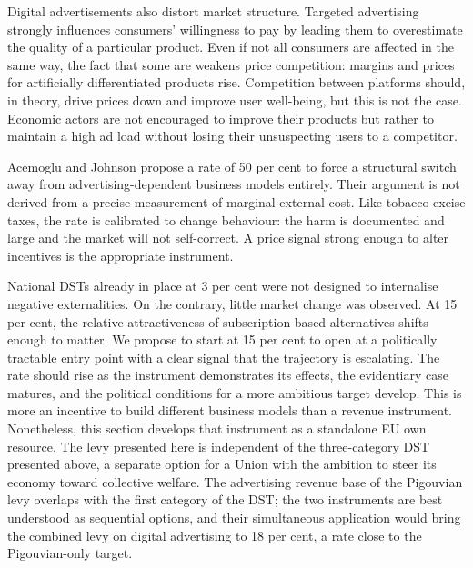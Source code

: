 \documentclass[../../main]{subfiles}
\begin{document}
Digital advertisements also distort market structure.
Targeted advertising strongly influences consumers’ willingness to pay by leading them to overestimate the quality of a particular product. 
Even if not all consumers are affected in the same way, the fact that some are weakens price competition: margins and prices for artificially differentiated products rise. 
Competition between platforms should, in theory, drive prices down and improve user well-being, but this is not the case. 
Economic actors are not encouraged to improve their products but rather to maintain a high ad load without losing their unsuspecting users to a competitor.


Acemoglu and Johnson propose a rate of 50 per cent to force a structural switch away from advertising-dependent business models entirely.
Their argument is not derived from a precise measurement of marginal external cost.
Like tobacco excise taxes, the rate is calibrated to change behaviour: the harm is documented and large and the market will not self-correct.
A price signal strong enough to alter incentives is the appropriate instrument.

National DSTs already in place at 3 per cent were not designed to internalise negative externalities.
On the contrary, little market change was observed.
At 15 per cent, the relative attractiveness of subscription-based alternatives shifts enough to matter.
We propose to start at 15 per cent to open at a politically tractable entry point with a clear signal that the trajectory is escalating.
The rate should rise as the instrument demonstrates its effects, the evidentiary case matures, and the political conditions for a more ambitious target develop.
This is more an incentive to build different business models than a revenue instrument.
Nonetheless, this section develops that instrument as a standalone EU own resource.
The levy presented here is independent of the three-category DST presented above, a separate option for a Union with the ambition to steer its economy toward collective welfare.
The advertising revenue base of the Pigouvian levy overlaps with the first category of the DST; the two instruments are best understood as sequential options, and their simultaneous application would bring the combined levy on digital advertising to 18 per cent, a rate close to the Pigouvian-only target. %
\end{document}

